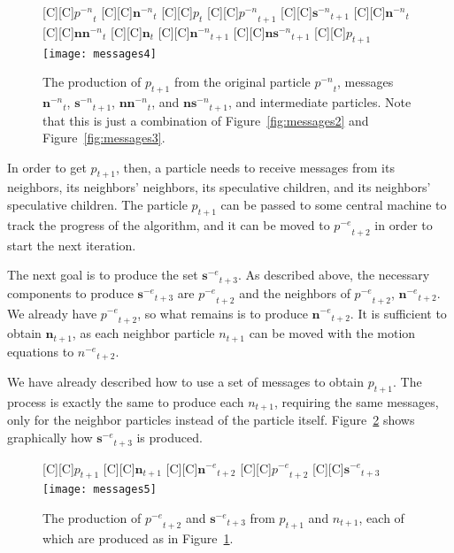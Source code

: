 \documentclass[journal,letterpaper]{IEEEtran}
\newcommand{\fig}[1]{Figure~\ref{fig:#1}}
\providecommand{\noeval}[1]{\ensuremath{#1^{-e}}}
\providecommand{\nonbest}[1]{\ensuremath{#1^{-n}}}
\providecommand{\p}{\ensuremath{p}}
\providecommand{\sset}{\ensuremath{\mathbf{s}}}
\providecommand{\nsset}{\ensuremath{\mathbf{ns}}}
\providecommand{\n}{\ensuremath{n}}
\providecommand{\nset}{\ensuremath{\mathbf{n}}}
\providecommand{\nnset}{\ensuremath{\mathbf{nn}}}
\begin{document}
\begin{figure}
  \centering
  [C][C]{$\nonbest{\p}_{t}$}
  [C][C]{$\nonbest{\nset}_{t}$}
  [C][C]{$\p_{t}$}
  [C][C]{$\nonbest{\p}_{t+1}$}
  [C][C]{$\nonbest{\sset}_{t+1}$}
  [C][C]{$\nonbest{\nset}_{t}$}
  [C][C]{$\nonbest{\nnset}_{t}$}
  [C][C]{$\nset_{t}$}
  [C][C]{$\nonbest{\nset}_{t+1}$}
  [C][C]{$\nonbest{\nsset}_{t+1}$}
  [C][C]{$\p_{t+1}$}
  \texttt{[image: messages4]}
  \caption{The production of $\p_{t+1}$ from the original particle 
  $\nonbest{\p}_{t}$, messages $\nonbest{\nset}_{t}$, $\nonbest{\sset}_{t+1}$,
  $\nonbest{\nnset}_{t}$, and $\nonbest{\nsset}_{t+1}$, and intermediate
  particles.  Note that this is just a combination of \fig{messages2} and
  \fig{messages3}.}
  \label{fig:messages4}
\end{figure}

In order to get $\p_{t+1}$, then, a particle needs to receive messages from its
neighbors, its neighbors' neighbors, its speculative children, and its
neighbors' speculative children.  The particle $\p_{t+1}$ can be passed to some
central machine to track the progress of the algorithm, and it can be moved to
$\noeval{\p}_{t+2}$ in order to start the next iteration.

The next goal is to produce the set $\noeval{\sset}_{t+3}$.  As described
above, the necessary components to produce $\noeval{\sset}_{t+3}$ are
$\noeval{\p}_{t+2}$ and the neighbors of $\noeval{\p}_{t+2}$,
$\noeval{\nset}_{t+2}$.  We already have $\noeval{\p}_{t+2}$, so what remains
is to produce $\noeval{\nset}_{t+2}$.  It is sufficient to obtain
$\nset_{t+1}$, as each neighbor particle $\n_{t+1}$ can be moved with the
motion equations to $\noeval{\n}_{t+2}$.

We have already described how to use a set of messages to obtain $\p_{t+1}$.
The process is exactly the same to produce each $\n_{t+1}$, requiring the same
messages, only for the neighbor particles instead of the particle itself.
\fig{messages5} shows graphically how $\noeval{\sset}_{t+3}$ is produced.

\begin{figure}
  \centering
  [C][C]{$\p_{t+1}$}
  [C][C]{$\nset_{t+1}$}
  [C][C]{$\noeval{\nset}_{t+2}$}
  [C][C]{$\noeval{\p}_{t+2}$}
  [C][C]{$\noeval{\sset}_{t+3}$}
  \texttt{[image: messages5]}
  \caption{The production of $\noeval{\p}_{t+2}$ and $\noeval{\sset}_{t+3}$
  from $\p_{t+1}$ and $\n_{t+1}$, each of which are produced as in
  \fig{messages4}.}
  \label{fig:messages5}
\end{figure}
\end{document}
